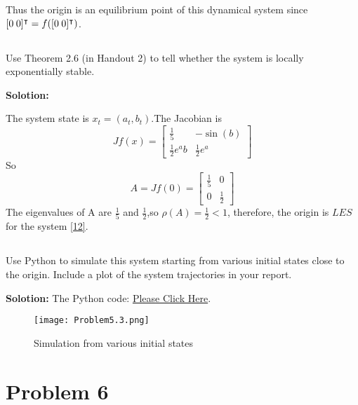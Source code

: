 \documentclass[a4paper,11pt,reqno]{amsart}
\newcommand{\tran}{\intercal}
\begin{document}
Thus the origin is an equilibrium point of this dynamical system since $[0 \hspace{0.25em} 0]^{\tran} = f([0 \hspace{0.25em} 0]^{\tran})$.

\subsection{}
Use Theorem 2.6 (in Handout 2) to tell whether the system is locally exponentially stable.

\textbf{Solotion:}

The system state is $x_t = (a_t,b_t)$.The Jacobian is
\begin{equation}
    Jf(x) = \begin{bmatrix} \frac{1}{5} & -\sin(b) \\ \frac{1}{2}e^{a}b & \frac{1}{2}e^{a} \end{bmatrix}
\end{equation}
So  
\begin{equation}
    A = Jf(0) = \begin{bmatrix} \frac{1}{5} & 0 \\ 0 & \frac{1}{2} \end{bmatrix}
\end{equation}
The eigenvalues of A are $\frac{1}{5}$ and $\frac{1}{2}$,so $\rho(A) = \frac{1}{2} < 1$,
therefore, the origin is $LES$ for the system \ref{12}.

\subsection{}
Use Python to simulate this system starting from various initial states close to the origin. Include
a plot of the system trajectories in your report.

\textbf{Solotion:}
The Python code: \href{https://github.com/Chanawesome/ELE8088-EXTRA/blob/main/Problem5.3.py}{Please Click Here}.

\begin{figure}[H]
    \centering
    \texttt{[image: Problem5.3.png]}
    \caption{Simulation from various initial states}
    \label{f5}
    \end{figure}

\section{Problem 6}
\end{document}

